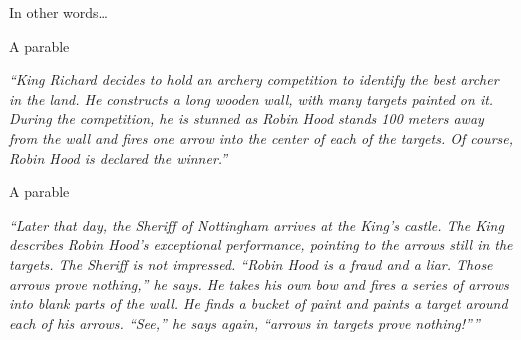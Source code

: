 \documentclass[aspectratio=169, lualatex, handout]{beamer}
\begin{document}
\begin{frame}{In other words\ldots}
	\begin{center}
	\end{center}
\end{frame}

\begin{frame}{A parable}
	\begin{center}
		\vfill
		\large
		\textit{\rmfamily ``King Richard decides to hold an archery competition to identify the best archer in the land. He constructs a long wooden wall, with many targets painted on it. During the competition, he is stunned as Robin Hood stands 100 meters away from the wall and fires one arrow into the center of each of the targets. Of course, Robin Hood is declared the winner.''}
		\vfill
	\end{center}
\end{frame}

\begin{frame}{A parable}
	\begin{center}
		\vfill
		\large
		\textit{\rmfamily ``Later that day, the Sheriff of Nottingham arrives at the King's castle. The King describes Robin Hood's exceptional performance, pointing to the arrows still in the targets. The Sheriff is not impressed. “Robin Hood is a fraud and a liar. Those arrows prove nothing,” he says. He takes his own bow and fires a series of arrows into blank parts of the wall. He finds a bucket of paint and paints a target around each of his arrows. ``See,'' he says again, ``arrows in targets prove nothing!''''}
		\vfill
	\end{center}
\end{frame}
\end{document}
